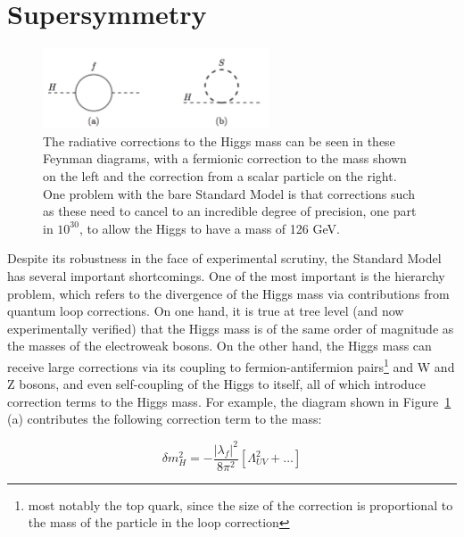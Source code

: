  
 
 
\section{Supersymmetry}

\begin{centering}
    \begin{figure} \center
    \includegraphics[width=0.6\textwidth]{Theory/FeynmanDiagrams/Higgs_mass_corrections.pdf}
    \caption{The radiative corrections to the Higgs mass can be seen
    in these Feynman diagrams, with a fermionic correction to the mass shown on the left and 
    the correction from a scalar particle on the right.  One problem with the bare Standard Model
    is that corrections such as these need to cancel to an incredible
    degree of precision, one part in $10^{30}$, to allow the Higgs to have a mass of 126 GeV. \cite{martin}
    \label{fig:higgs_mass_corrections}}
    \end{figure}
\end{centering}

Despite its robustness in the face of experimental scrutiny, the Standard Model has several 
important shortcomings.  One of the most important is the hierarchy problem, which refers 
to the divergence of the Higgs mass via contributions from quantum loop corrections.
On one hand, it is true at tree level (and now experimentally verified) that the Higgs 
mass is of the same order of magnitude as the masses of the electroweak bosons.  
On the other hand, the Higgs mass can receive large corrections via its coupling
to fermion-antifermion 
pairs\footnote{most notably the top quark, since the size of the correction is proportional
to the mass of the particle in the loop correction} and W and Z bosons, and
even self-coupling of the Higgs to itself, 
all of which introduce correction terms to the Higgs mass.  For example, the 
diagram shown in Figure~\ref{fig:higgs_mass_corrections} (a) 
contributes the following correction term to the mass:

\begin{equation}
	\delta m_H^2 = - \frac{|\lambda_f |^2}{8\pi^2}[\Lambda_{UV}^2+\ldots]
\end{equation}

